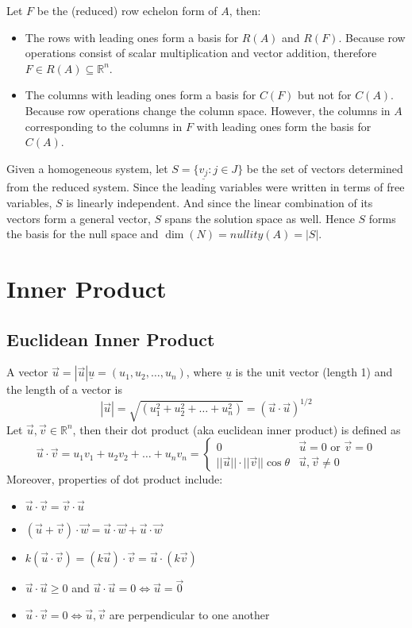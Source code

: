 \documentclass{article}
\begin{document}
Let $F$ be the (reduced) row echelon form of $A$, then: 
\begin{itemize}
	\item The rows with leading ones form a basis for $R(A)$ and $R(F)$. Because row operations consist of scalar multiplication and vector addition, therefore $F \in R(A) \subseteq \mathbb{R}^n$.
	\item The columns with leading ones form a basis for $C(F)$ but not for $C(A)$. Because row operations change the column space. However, the columns in $A$ corresponding to the columns in $F$ with leading ones form the basis for $C(A)$.
\end{itemize}

Given a homogeneous system, let $S= \{\underline{v_j}: j \in J\}$ be the set of vectors determined from the reduced system. Since the leading variables were written in terms of free variables, $S$ is linearly independent. And since the linear combination of its vectors form a general vector, $S$ spans the solution space as well. Hence $S$ forms the basis for the null space and $\dim(N) = nullity(A) = |S|$.

\section{Inner Product}

\subsection{Euclidean Inner Product}

A vector $\vec{u} = |\vec{u}| \underline{u} = (u_1, u_2, \dots, u_n)$, where $\underline{u}$ is the unit vector (length 1) and the length of a vector is
$$|\vec{u}| = \sqrt{(u_1^2 + u_2^2 + \dots + u_n^2)} = (\vec{u} \cdot \vec{u})^{1/2}$$
Let $\vec{u}, \vec{v} \in \mathbb{R}^n$, then their dot product (aka euclidean inner product) is defined as
$$\vec{u} \cdot \vec{v} = u_1v_1 + u_2v_2 + \dots + u_nv_n = \begin{cases} 0 & \vec{u} = 0 \text{ or } \vec{v} = 0 \\ ||\vec{u}|| \cdot ||\vec{v}||\cos\theta & \vec{u}, \vec{v} \not= 0\end{cases}$$
Moreover, properties of dot product include:
\begin{itemize}
	\item $\vec{u} \cdot \vec{v} = \vec{v} \cdot \vec{u}$
	\item $(\vec{u} + \vec{v}) \cdot \vec{w} = \vec{u} \cdot \vec{w} + \vec{u} \cdot \vec{w}$
	\item $k(\vec{u} \cdot \vec{v}) = (k\vec{u}) \cdot \vec{v} = \vec{u} \cdot (k\vec{v})$
	\item $\vec{u} \cdot \vec{u} \geq 0$ and $\vec{u} \cdot \vec{u} = 0 \iff \vec{u} = \vec{0}$
	\item $\vec{u} \cdot \vec{v} = 0 \iff \vec{u}, \vec{v}$ are perpendicular to one another
\end{itemize}
\end{document}
